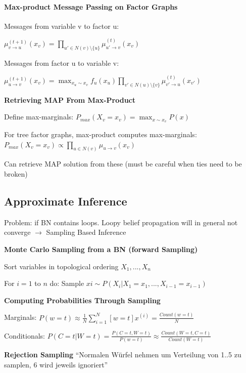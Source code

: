 \documentclass[a4paper, 10pt]{scrartcl}
\begin{document}
\begin{multicols*}{3}
\paragraph{Max-product Message Passing on Factor Graphs}

Messages from variable v to factor u: 

$\mu^{(t+1)}_{v \rightarrow u}(x_v) = \prod_{u' \in N(v) \setminus \{u\}} \mu^{(t)}_{u' \rightarrow v}(x_{v})$ 

Messages from factor u to variable v:

$\mu^{(t+1)}_{u \rightarrow v}(x_v) = \max_{x_u \sim x_v} f_u(x_u) \prod_{v' \in N(u) \setminus \{v\}} \mu^{(t)}_{v' \rightarrow u}(x_{v'})$ 
 
 \textbf{Retrieving MAP From Max-Product}
 \begin{compactitem}
 \item Define max-marginals: $P_{max}(X_v =x_v) = \max_{x \sim x_v} P(x)$
 \item For tree factor graphs, max-product computes max-marginals: 
 $P_{max}(X_v = x_v) \propto \prod_{u \in N(v)} \mu_{u \rightarrow v} (x_v)$ 
\item Can retrieve MAP solution from these (must be careful when ties need to be broken)
\end{compactitem}
\subsection{Approximate Inference}
Problem: if BN contains loops.
Loopy belief propagation will in general not converge	$\rightarrow$ Sampling Based Inference

\textbf{Monte Carlo Sampling from a BN (forward Sampling)}
\begin{compactitem}
	\item Sort variables in topological ordering $X_1,...,X_n$
	\item For $i=1$ to 	$n$ do: Sample $xi \sim P(X_i | X_1=x_1, ..., X_{i-1}=x_{i-1})$
\end{compactitem}

\textbf{Computing Probabilities Through Sampling}

Marginals: $P(w=t) \approx \frac{1}{N} \sum_{i=1}^{N}[w=t]x^{(i)} =\frac{ Count(w=t)}{N}$

Conditionals: $P(C=t | W=t) = \frac{P(C=t, W=t)}{P(w=t)} \approx \frac{Count(W=t, C=t)}{Count(W=t)}$

\textbf{Rejection Sampling}
``Normalen Würfel nehmen um Verteilung von 1..5 zu samplen, 6 wird jeweils ignoriert''


\end{multicols*}
\end{document}
